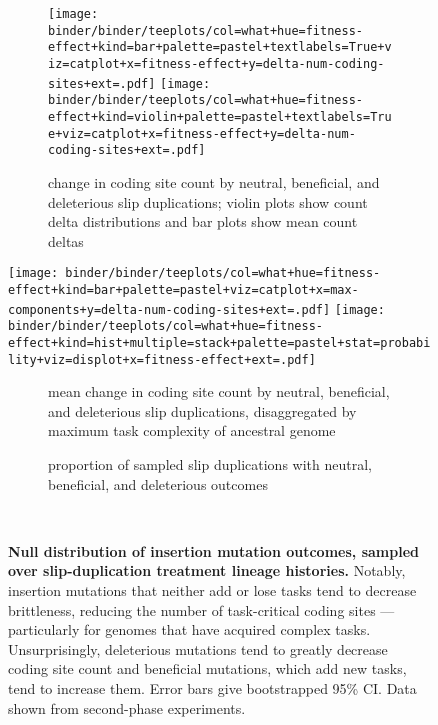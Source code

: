 \begin{figure*}
    \centering
    \begin{subfigure}{\textwidth}
    \texttt{[image: binder/binder/teeplots/col=what+hue=fitness-effect+kind=bar+palette=pastel+textlabels=True+viz=catplot+x=fitness-effect+y=delta-num-coding-sites+ext=.pdf]}%
    \texttt{[image: binder/binder/teeplots/col=what+hue=fitness-effect+kind=violin+palette=pastel+textlabels=True+viz=catplot+x=fitness-effect+y=delta-num-coding-sites+ext=.pdf]}
    \caption{\footnotesize change in coding site count by neutral, beneficial, and deleterious slip duplications; violin plots show count delta distributions and bar plots show mean count deltas}
    \end{subfigure}

\begin{minipage}{\linewidth}
    \texttt{[image: binder/binder/teeplots/col=what+hue=fitness-effect+kind=bar+palette=pastel+viz=catplot+x=max-components+y=delta-num-coding-sites+ext=.pdf]}
    \texttt{[image: binder/binder/teeplots/col=what+hue=fitness-effect+kind=hist+multiple=stack+palette=pastel+stat=probability+viz=displot+x=fitness-effect+ext=.pdf]}
\end{minipage}

    \begin{subfigure}{0.35\linewidth}
    \caption{\footnotesize  mean change in coding site count by neutral, beneficial, and deleterious slip duplications, disaggregated by maximum task complexity of ancestral genome}
    \end{subfigure}
    \begin{subfigure}{0.64\linewidth}
    \centering
    \caption{\footnotesize proportion of sampled slip duplications with neutral, beneficial, and deleterious outcomes}
    \end{subfigure}
~\\
    \caption{
        \textbf{Null distribution of insertion mutation outcomes, sampled over slip-duplication treatment lineage histories.}
        \footnotesize
        Notably, insertion mutations that neither add or lose tasks tend to decrease brittleness, reducing the number of task-critical coding sites --- particularly for genomes that have acquired complex tasks.
        Unsurprisingly, deleterious mutations tend to greatly decrease coding site count and beneficial mutations, which add new tasks, tend to increase them.
        Error bars give bootstrapped 95\% CI.
        Data shown from second-phase experiments.
    }
    \label{fig:nulldist}
\end{figure*}
